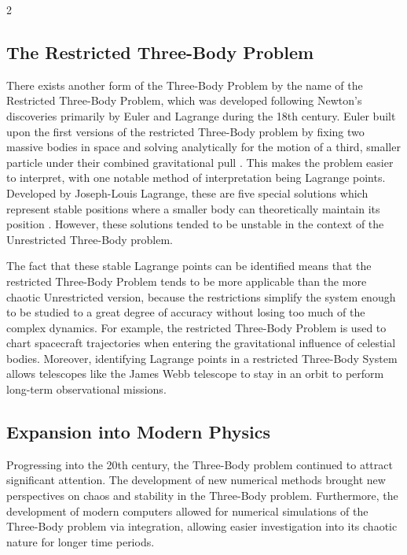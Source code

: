\documentclass{article}
\begin{document}
\begin{multicols}{2}
\subsection{The Restricted Three-Body Problem}
There exists another form of the Three-Body Problem by the name of the Restricted Three-Body Problem, which was developed following Newton's discoveries primarily by Euler and Lagrange during the 18th century. Euler built upon the first versions of the restricted Three-Body problem by fixing two massive bodies in space and solving analytically for the motion of a third, smaller particle under their combined gravitational pull \cite{bistafa2021euler}. This makes the problem easier to interpret, with one notable method of interpretation being Lagrange points. Developed by Joseph-Louis Lagrange, these are five special solutions which represent stable positions where a smaller body can theoretically maintain its position \cite{lagrange1772essai}. However, these solutions tended to be unstable in the context of the Unrestricted Three-Body problem.

The fact that these stable Lagrange points can be identified means that the restricted Three-Body Problem tends to be more applicable than the more chaotic Unrestricted version, because the restrictions simplify the system enough to be studied to a great degree of accuracy without losing too much of the complex dynamics. For example, the restricted Three-Body Problem is used to chart spacecraft trajectories when entering the gravitational influence of celestial bodies. Moreover, identifying Lagrange points in a restricted Three-Body System allows telescopes like the James Webb telescope \citep{gardner2006james} to stay in an orbit to perform long-term observational missions.

\subsection{Expansion into Modern Physics}
\label{exp_phys}
Progressing into the 20th century, the Three-Body problem continued to attract significant attention. The development of new numerical methods brought new perspectives on chaos and stability in the Three-Body problem. Furthermore, the development of modern computers allowed for numerical simulations of the Three-Body problem via integration, allowing easier investigation into its chaotic nature for longer time periods.


\end{multicols}
\end{document}
